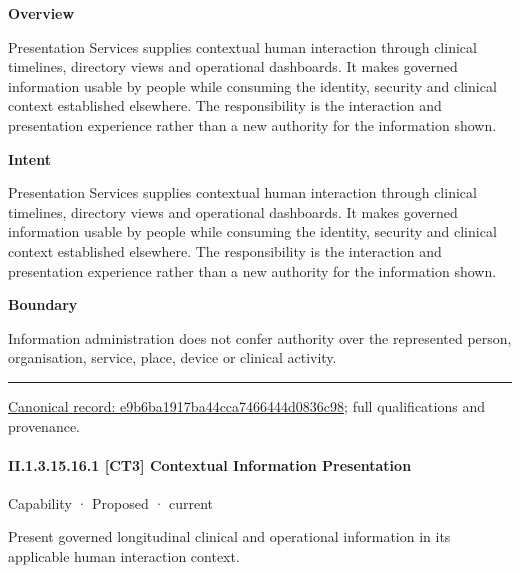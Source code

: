 \textbf{Overview}



Presentation Services supplies contextual human interaction through clinical timelines, directory views and operational dashboards. It makes governed information usable by people while consuming the identity, security and clinical context established elsewhere. The responsibility is the interaction and presentation experience rather than a new authority for the information shown.



\textbf{Intent}



Presentation Services supplies contextual human interaction through clinical timelines, directory views and operational dashboards. It makes governed information usable by people while consuming the identity, security and clinical context established elsewhere. The responsibility is the interaction and presentation experience rather than a new authority for the information shown.



\textbf{Boundary}



Information administration does not confer authority over the represented person, organisation, service, place, device or clinical activity.



\medskip\hrule\medskip

{\footnotesize \href{../../../../continuum/strategy/capability/e9b6ba1917ba44cca7466444d0836c98.md}{Canonical record: e9b6ba1917ba44cca7466444d0836c98}; full qualifications and provenance.}\par
\paragraph*{II.1.3.15.16.1 [CT3] Contextual Information Presentation}
\label{navigation:II.1.3.15.16.1}

\label{element:9f900c53ae56488cad69e53c2205e898}
{\small Capability · Proposed · current}\par

Present governed longitudinal clinical and operational information in its applicable human interaction context.



